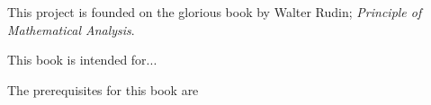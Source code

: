 \documentclass[../../templates/chapter]{subfiles}
\begin{document}
This project is founded on the glorious book by Walter Rudin; \emph{Principle of
Mathematical Analysis}\cite{rudin}.

This book is intended for...

The prerequisites for this book are
\end{document}
